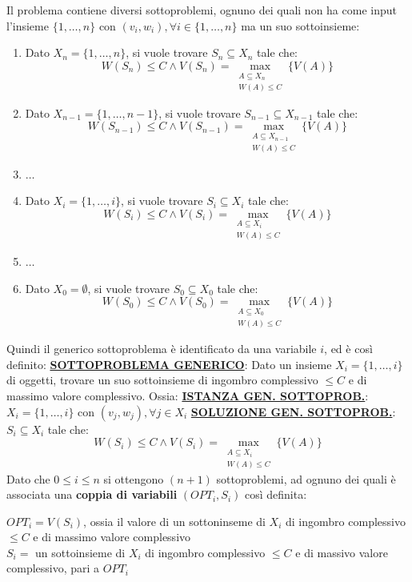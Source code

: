 \documentclass[12pt]{article}
\begin{document}
Il problema contiene diversi sottoproblemi, ognuno dei quali non ha come input l'insieme $\{1,\dots, n\}$ con $(v_i, w_i), \forall i \in \{1,\dots,n\}$ ma un suo sottoinsieme:
\begin{enumerate}
    \item Dato $X_n = \{1, \dots, n\}$, si vuole trovare $S_n \subseteq X_n$ tale che:
    $$W(S_n) \leq C \land V(S_n) = \max_{\substack{A \subseteq X_n \\ W(A) \leq C}}\{V(A)\}$$
    \item Dato $X_{n-1} = \{1, \dots, n-1\}$, si vuole trovare $S_{n-1} \subseteq X_{n-1}$ tale che:
    $$W(S_{n-1}) \leq C \land V(S_{n-1}) = \max_{\substack{A \subseteq X_{n-1} \\ W(A) \leq C}}\{V(A)\}$$
    \item $\dots$
    \item Dato $X_i = \{1, \dots, i\}$, si vuole trovare $S_i \subseteq X_i$ tale che:
    $$W(S_i) \leq C \land V(S_i) = \max_{\substack{A \subseteq X_i \\ W(A) \leq C}}\{V(A)\}$$
    \item $\dots$
    \item Dato $X_0 = \emptyset$, si vuole trovare $S_0 \subseteq X_0$ tale che:
    $$W(S_0) \leq C \land V(S_0) = \max_{\substack{A \subseteq X_0 \\ W(A) \leq C}}\{V(A)\}$$
\end{enumerate}
Quindi il generico sottoproblema è identificato da una variabile $i$, ed è così definito: \newline
\textbf{\underline{SOTTOPROBLEMA GENERICO}}: Dato un insieme $X_i = \{1, \dots, i\}$ di oggetti, trovare un suo sottoinsieme di ingombro complessivo $\leq C$ e di massimo valore complessivo. \newline
Ossia: \newline
\textbf{\underline{ISTANZA GEN. SOTTOPROB.}}: $X_i = \{1,\dots, i\}$ con $(v_j, w_j), \forall j \in X_i$ \newline
\textbf{\underline{SOLUZIONE GEN. SOTTOPROB.}}: $S_i \subseteq X_i$ tale che:
$$W(S_i) \leq C \land V(S_i) = \max_{\substack{A \subseteq X_i \\ W(A) \leq C}} \{V(A)\}$$
Dato che $0 \leq i \leq n$ si ottengono $(n+1)$ sottoproblemi, ad ognuno dei quali è associata una \textbf{coppia di variabili} $(OPT_i, S_i)$ così definita:
\begin{center}
    $OPT_i = V(S_i)$, ossia il valore di un sottoninseme di $X_i$ di ingombro complessivo $\leq C$ e di massimo valore complessivo \\
    $S_i =$ un sottoinsieme di $X_i$ di ingombro complessivo $\leq C$ e di massivo valore complessivo, pari a $OPT_i$
\end{center}
\end{document}
